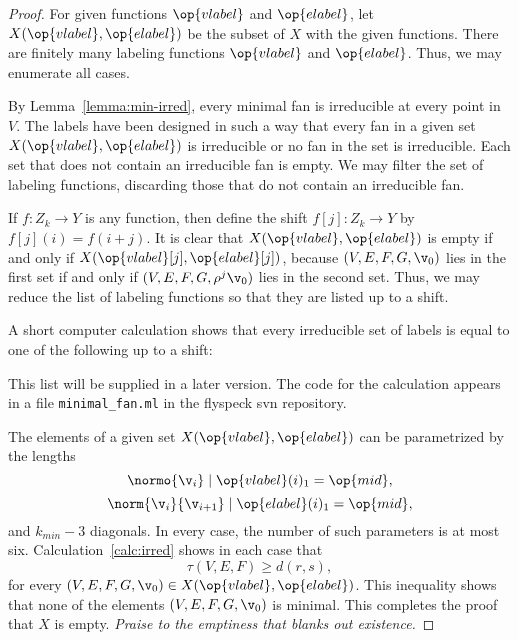 \begin{proof}
For given functions $\op{vlabel}$ and $\op{elabel}$, let
$X(\op{vlabel},\op{elabel})$ be the subset of $X$ with the given
functions.  There are finitely many labeling functions $\op{vlabel}$
and $\op{elabel}$.  Thus, we may enumerate all cases.

By Lemma~\ref{lemma:min-irred}, every minimal fan is irreducible at
every point in $V$.  The labels have been designed in such a way that
every fan in a given set $X(\op{vlabel},\op{elabel})$ is irreducible
or no fan in the set is irreducible.  Each set that does not contain
an irreducible fan is empty.  We may filter the set of labeling
functions, discarding those that do not contain an irreducible fan.

If $f:Z_k\to Y$ is any function, then define the shift $f[j]:Z_k\to Y$
by $f[j](i) = f(i+j)$.  It is clear that $X(\op{vlabel},\op{elabel})$
is empty if and only if $X(\op{vlabel}[j],\op{elabel}[j])$, because
$(V,E,F,G,\v_0)$ lies in the first set if and only if
$(V,E,F,G,\rho^j\v_0)$ lies in the second set.  Thus, we may reduce
the list of labeling functions so that they are listed up to a shift.

A short computer calculation shows that every irreducible set of
labels is equal to one of the following up to a shift:

\begin{note}%
This list will be supplied in a later version.  The code for the
calculation appears in a file \verb!minimal_fan.ml! in the flyspeck
svn repository.
\end{note}

The elements of a given set $X(\op{vlabel},\op{elabel})$ can be
parametrized by the lengths
\begin{displaymath}\normo{\v_i} \mid \op{vlabel}(i)_1 =
\op{mid},\end{displaymath}
\begin{displaymath}\norm{\v_i}{\v_{i+1}} \mid \op{elabel}(i)_1 =
  \op{mid},\end{displaymath}
and $k_{min}-3$ diagonals.  In every case, the number of such 
parameters is at most six.    Calculation~\ref{calc:irred} %
shows in each case that
\begin{displaymath}
\tau(V,E,F) \ge d(r,s),
\end{displaymath}
for every $(V,E,F,G,\v_0)\in X(\op{vlabel},\op{elabel})$.  This
inequality shows that none of the elements $(V,E,F,G,\v_0)$ is
minimal.  This completes the proof that $X$ is empty.  {\it Praise to
the emptiness that blanks out
existence.} %
%
\end{proof}

